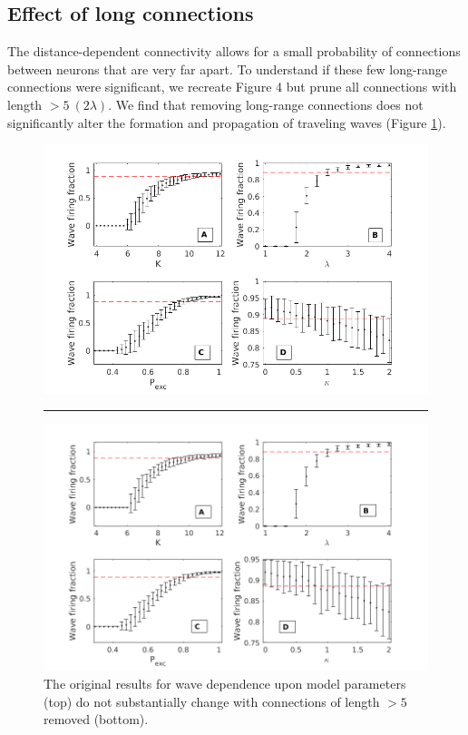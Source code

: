 \documentclass[12pt]{article}
\begin{document}
\subsection*{Effect of long connections}
\color{red}
The distance-dependent connectivity allows for a small probability of connections between neurons that are very far apart.
To understand if these few long-range connections were significant, we recreate Figure 4 but prune all connections with length $>5\ (2\lambda)$.
We find that removing long-range connections does not significantly alter the formation and propagation of traveling waves (Figure \ref{fig:wave_parameters_nolongconnections}).
\begin{figure}[!htb]
 \centering
 \includegraphics[width=\textwidth]{fig/ParamWaveSim} 
 \rule{\textwidth}{1bp}
 \includegraphics[width=\textwidth]{fig/ParamWaveSim_NoLongConnections}
 \caption{The original results for wave dependence upon model parameters (top) do not substantially change with connections of length $>5$ removed (bottom). }
 \label{fig:wave_parameters_nolongconnections}
\end{figure}
\FloatBarrier
\end{document}
